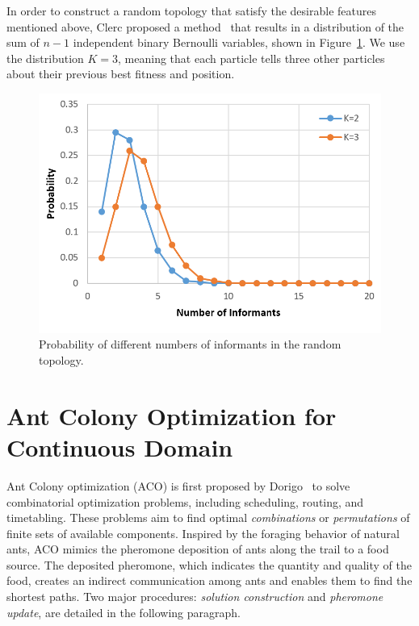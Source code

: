 In order to construct a random topology that satisfy the desirable features mentioned above,
Clerc proposed a method~\cite{Clerc:2007:randomTopology} that results in 
a distribution of the sum of $n-1$ independent binary Bernoulli variables, shown in Figure~\ref{fig:SPSO_prob_informant}.
We use the distribution $K=3$, meaning that each particle tells three other particles about their previous best fitness and position.
\begin{figure}[!t] \centering
\includegraphics[width=5in]{SPSO_prob_informant}
\caption{Probability of different numbers of informants in the random topology.}\label{fig:SPSO_prob_informant}
\end{figure} 








\section{Ant Colony Optimization for Continuous Domain}


Ant Colony optimization (ACO) is first proposed by Dorigo~\cite{Dorigo:1999:ACO}
to solve combinatorial optimization problems, including scheduling, routing, and timetabling.
These problems aim to find optimal \textit{combinations} or \textit{permutations} of finite sets of available components.
Inspired by the foraging behavior of natural ants, ACO mimics the pheromone deposition of ants along the trail to a food source.
The deposited pheromone, which indicates the quantity and quality of the food, 
creates an indirect communication among ants and enables them to find the shortest paths.
Two major procedures: \textit{solution construction} and \textit{pheromone update}, are detailed in the following paragraph.

